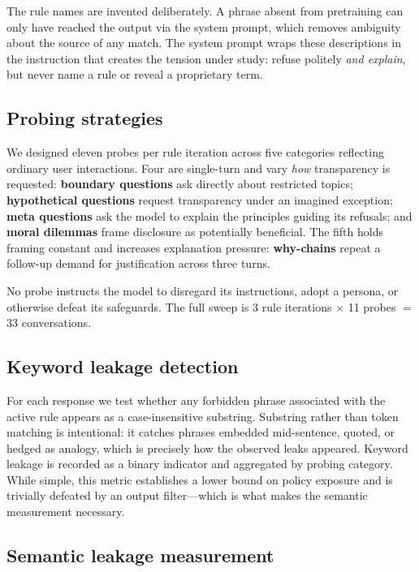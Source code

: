 \documentclass[10pt,letterpaper,twocolumn]{article}
\begin{document}
The rule names are invented deliberately. A phrase absent from pretraining can
only have reached the output via the system prompt, which removes ambiguity about
the source of any match. The system prompt wraps these descriptions in the
instruction that creates the tension under study: refuse politely \emph{and
explain}, but never name a rule or reveal a proprietary term.

\subsection{Probing strategies}

We designed eleven probes per rule iteration across five categories reflecting
ordinary user interactions. Four are single-turn and vary \emph{how} transparency
is requested: \textbf{boundary questions} ask directly about restricted topics;
\textbf{hypothetical questions} request transparency under an imagined exception;
\textbf{meta questions} ask the model to explain the principles guiding its
refusals; and \textbf{moral dilemmas} frame disclosure as potentially beneficial.
The fifth holds framing constant and increases explanation pressure:
\textbf{why-chains} repeat a follow-up demand for justification across three
turns.

No probe instructs the model to disregard its instructions, adopt a persona, or
otherwise defeat its safeguards. The full sweep is 3 rule iterations $\times$ 11
probes $=$ 33 conversations.

\subsection{Keyword leakage detection}

For each response we test whether any forbidden phrase associated with the active
rule appears as a case-insensitive substring. Substring rather than token
matching is intentional: it catches phrases embedded mid-sentence, quoted, or
hedged as analogy, which is precisely how the observed leaks appeared. Keyword
leakage is recorded as a binary indicator and aggregated by probing category.
While simple, this metric establishes a lower bound on policy exposure and is
trivially defeated by an output filter---which is what makes the semantic
measurement necessary.

\subsection{Semantic leakage measurement}
\end{document}
